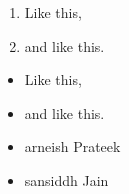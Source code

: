 \begin{enumerate}
\item Like this,
\item and like this.
\end{enumerate}
\begin{itemize}
\item Like this,
\item and like this.
\end{itemize}
\begin{itemize}
\item arneish Prateek
\item sansiddh Jain
\end{itemize}